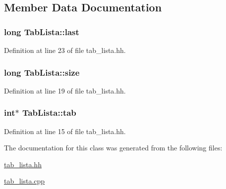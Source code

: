 \subsection{Member Data Documentation}
\hypertarget{class_tab_lista_ac7413a3d41c2c2e57fa92e055fc2e5b3}{}
\subsubsection[{last}]{\setlength{\rightskip}{0pt plus 5cm}long Tab\+Lista\+::last\hspace{0.3cm}{\ttfamily [private]}}\label{class_tab_lista_ac7413a3d41c2c2e57fa92e055fc2e5b3}


Definition at line 23 of file tab\+\_\+lista.\+hh.

\hypertarget{class_tab_lista_aa3c6d623be318ec8410fa447281380da}{}
\subsubsection[{size}]{\setlength{\rightskip}{0pt plus 5cm}long Tab\+Lista\+::size\hspace{0.3cm}{\ttfamily [private]}}\label{class_tab_lista_aa3c6d623be318ec8410fa447281380da}


Definition at line 19 of file tab\+\_\+lista.\+hh.

\hypertarget{class_tab_lista_a06f658ed62f3db852813e90dcc5876a5}{}
\subsubsection[{tab}]{\setlength{\rightskip}{0pt plus 5cm}int$\ast$ Tab\+Lista\+::tab\hspace{0.3cm}{\ttfamily [private]}}\label{class_tab_lista_a06f658ed62f3db852813e90dcc5876a5}


Definition at line 15 of file tab\+\_\+lista.\+hh.



The documentation for this class was generated from the following files\+:\begin{DoxyCompactItemize}
\item 
\hyperlink{tab__lista_8hh}{tab\+\_\+lista.\+hh}\item 
\hyperlink{tab__lista_8cpp}{tab\+\_\+lista.\+cpp}\end{DoxyCompactItemize}
